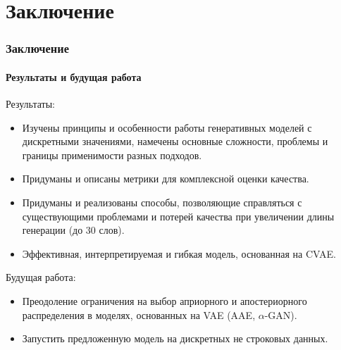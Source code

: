 \documentclass[10pt]{beamer}
\begin{document}
\section{Заключение}
\begin{frame}
\frametitle{Заключение}
\framesubtitle{Результаты и будущая работа}


Результаты:
\begin{itemize}
    \item Изучены принципы и особенности работы генеративных моделей с дискретными значениями, намечены основные сложности, проблемы и границы применимости разных подходов.
    \item Придуманы и описаны метрики для комплексной оценки качества.
    \item Придуманы и реализованы способы, позволяющие справляться с существующими проблемами и потерей качества при увеличении длины генерации (до $30$ слов).
    \item Эффективная, интерпретируемая и гибкая модель, основанная на CVAE.
\end{itemize}

\vskip4mm

Будущая работа:
\begin{itemize}
    \item Преодоление ограничения на выбор априорного и апостериорного распределения в моделях, основанных на VAE (AAE, $\alpha$-GAN).
    \item Запустить предложенную модель на дискретных не строковых данных.
\end{itemize}

\end{frame}
\end{document}
